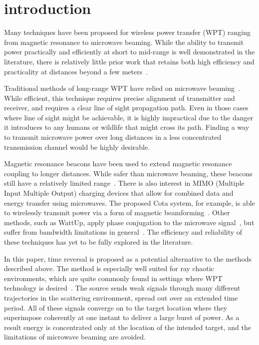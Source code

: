 \section{introduction}
\label{sec:intro}

Many techniques have been proposed for wireless power transfer (WPT)
ranging from magnetic resonance to microwave beaming.
%
While the ability to transmit power practically and efficiently at short to
mid-range is well demonstrated in the literature, there is relatively little
prior work that retains both high efficiency and practicality at distances
beyond a few meters~\cite{wpt-progress}.



Traditional methods of long-range WPT have relied on microwave
beaming~\cite{history-wpt}.
%
While efficient, this technique requires precise alignment of transmitter and
receiver, and requires a clear line of sight propagation path.
%
Even in those cases where line of sight might be achievable, it is highly
impractical due to the danger it introduces to any humans or wildlife that might
cross its path.
%
Finding a way to transmit microwave power over long distances in a less 
concentrated transmission channel would be highly desirable.



Magnetic resonance beacons have been used to extend magnetic resonance coupling
to longer distances.
%
While safer than microwave beaming, these beacons still have a relatively
limited range~\cite{wpt-progress}.
%
There is also interest in MIMO (Multiple Input Multiple Output) charging devices
that allow for combined data and energy transfer using microwaves.
%
The proposed Cota system, for example, is able to wirelessly transmit power via
a form of magnetic beamforming~\cite{mimo}.
%
Other methods, such as WattUp, apply phase conjugation to the
microwave signal~\cite{wattup}, but suffer from bandwidth
limitations in general~\cite{prada-mirror,derode-mult}.
%
The efficiency and reliability of these techniques has yet to be fully explored
in the literature.



In this paper, time reversal is proposed as a potential alternative to
the methods described above.
%
The method is especially well suited for ray chaotic environments, which are
quite commonly found in settings where WPT technology is desired~\cite{hemmady}.
%
The source sends weak signals through many different trajectories in the
scattering environment, spread out over an extended time period.
%
All of these signals converge on to the target location where they
superimpose coherently at one instant to deliver a large burst of power.
%
As a result energy is concentrated only at the location of the intended target,
and the limitations of microwave beaming are avoided.



